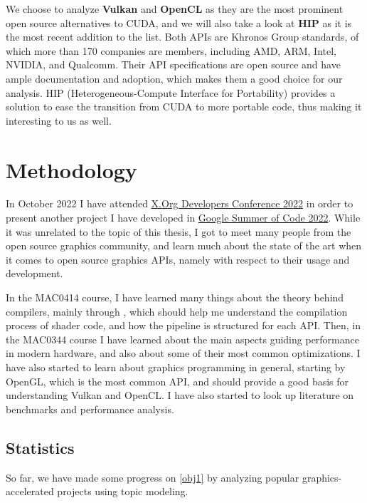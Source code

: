 \documentclass[11pt, conference, onecolumn, final]{IEEEtran}
\begin{document}
We choose to analyze \textbf{Vulkan} and \textbf{OpenCL} as they are the most
prominent open source alternatives to CUDA, and we will also take a look at
\textbf{HIP} as it is the most recent addition to the list.
Both APIs are Khronos Group standards, of which more than 170 companies are
members, including AMD, ARM, Intel, NVIDIA, and Qualcomm.
Their API specifications are open source and have ample documentation and
adoption, which makes them a good choice for our analysis.
HIP (Heterogeneous-Compute Interface for Portability) provides a solution to
ease the transition from CUDA to more portable code, thus making it interesting
to us as well.

\section{Methodology} \label{sec:methodology}

In October 2022 I have attended
\href{https://indico.freedesktop.org/event/2/page/11-overview}{X.Org Developers
Conference 2022} in order to present another project I have developed in
\href{https://summerofcode.withgoogle.com/programs/2022/projects/6AoBcunH}{Google
Summer of Code 2022}. While it was unrelated to the topic of this thesis, I
got to meet many people from the open source graphics community, and learn
much about the state of the art when it comes to open source graphics APIs,
namely with respect to their usage and development.

In the MAC0414 course, I have learned many things about the theory behind
compilers, mainly through \cite{sipser1996introduction}, which should help me
understand the compilation process of shader code, and how the pipeline is
structured for each API.
Then, in the MAC0344 course I have learned about the main aspects guiding
performance in modern hardware, and also about some of their most common
optimizations.
I have also started to learn about graphics programming in general, starting by
OpenGL, which is the most common API, and should provide a good basis for
understanding Vulkan and OpenCL. I have also started to look up literature on
benchmarks and performance analysis.

\subsection{Statistics} \label{sec:methodology:statistics}

So far, we have made some progress on \cref{obj1} by analyzing popular
graphics-accelerated projects using topic modeling.
\end{document}
